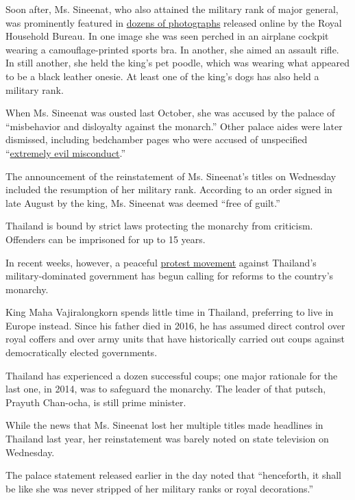 Soon after, Ms. Sineenat, who also attained the military rank of major
general, was prominently featured in
\href{https://www.nytimes3xbfgragh.onion/2019/08/27/world/asia/thailand-consort-king.html}{dozens
of photographs} released online by the Royal Household Bureau. In one
image she was seen perched in an airplane cockpit wearing a
camouflage-printed sports bra. In another, she aimed an assault rifle.
In still another, she held the king's pet poodle, which was wearing what
appeared to be a black leather onesie. At least one of the king's dogs
has also held a military rank.

When Ms. Sineenat was ousted last October, she was accused by the palace
of ``misbehavior and disloyalty against the monarch.'' Other palace
aides were later dismissed, including bedchamber pages who were accused
of unspecified
``\href{https://www.nytimes3xbfgragh.onion/2019/11/06/world/asia/thailand-king-consort-wives.html}{extremely
evil misconduct}.''

The announcement of the reinstatement of Ms. Sineenat's titles on
Wednesday included the resumption of her military rank. According to an
order signed in late August by the king, Ms. Sineenat was deemed ``free
of guilt.''

Thailand is bound by strict laws protecting the monarchy from criticism.
Offenders can be imprisoned for up to 15 years.

In recent weeks, however, a peaceful
\href{https://www.nytimes3xbfgragh.onion/2020/08/16/world/asia/thailand-protests-democracy-monarchy.html}{protest
movement} against Thailand's military-dominated government has begun
calling for reforms to the country's monarchy.

King Maha Vajiralongkorn spends little time in Thailand, preferring to
live in Europe instead. Since his father died in 2016, he has assumed
direct control over royal coffers and over army units that have
historically carried out coups against democratically elected
governments.

Thailand has experienced a dozen successful coups; one major rationale
for the last one, in 2014, was to safeguard the monarchy. The leader of
that putsch, Prayuth Chan-ocha, is still prime minister.

While the news that Ms. Sineenat lost her multiple titles made headlines
in Thailand last year, her reinstatement was barely noted on state
television on Wednesday.

The palace statement released earlier in the day noted that
``henceforth, it shall be like she was never stripped of her military
ranks or royal decorations.''

